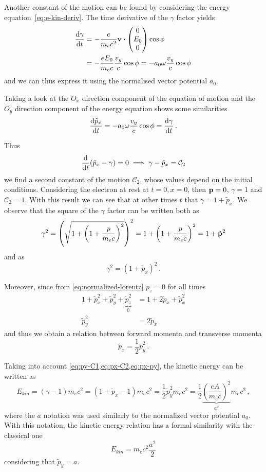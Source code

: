 \documentclass[12pt, class=report, crop=false]{standalone}
\begin{document}
Another constant of the motion can be found by considering the energy
equation~\eqref{eq:e-kin-deriv}. The time derivative of the \(\gamma\) factor
yields
\[
\begin{aligned}
  \dv{\gamma}{t} &= -\frac{e}{m_e c^2} \vb{v} \vdot
  \begin{pmatrix}
    0 \\ E_0 \\ 0
  \end{pmatrix}
  \cos{\phi} \\
  &= -\frac{e E_0}{m_e c}\frac{v_y}{c}\cos{\phi}
  = -a_0\omega \frac{v_y}{c}\cos{\phi}\,
\end{aligned}
\]
and we can thus express it using the normalised vector potential \(a_0\).

Taking a look at the \(O_x\) direction component of the equation of motion and
the \(O_y\) direction component of the energy equation shows some similarities
\[
\dv{\tilde{p}_x}{t} = -a_0\omega \frac{v_y}{c}\cos{\phi} = \dv{\gamma}{t}\,.
\]

Thus
\begin{equation}
  \label{eq:px-C2}
  \dv{t}(\tilde{p}_x - \gamma) = 0 \implies \gamma - \tilde{p}_x = \mathcal{C}_2
\end{equation}
we find a second constant of the motion \(\mathcal{C}_2\), whose values depend on
the initial conditions. Considering the electron at rest at \(t=0,x=0\), then
\(\vb{p}=0\), \(\gamma=1\) and \(\mathcal{C}_2=1\). With this result we can see
that at other times \(t\) that \(\gamma=1+\tilde{p}_x\). We observe that the
square of the \(\gamma\) factor can be written both as
\[
\gamma^2 = {\left(\sqrt{1+{\left(1+\frac{p}{m_e c}\right)}^2}\right)}^2 =
1 + {\left(1+\frac{p}{m_e c}\right)}^2  = 1 + \tilde{\vb{p}}^2
\]
and as
\[
\gamma^2 = {(1+\tilde{p}_x)}^2\,.
\]

Moreover, since from \cref{eq:normalized-lorentz} \(p_z=0\) for all times
\[
\begin{aligned}
  1 + \tilde{p}_x^2 + \tilde{p}_y^2 + \underbrace{\tilde{p}_z^2}_0 &=
  1 + 2\tilde{p}_x + \tilde{p}_x^2 \\
  \tilde{p}_y^2 &= 2\tilde{p}_x
\end{aligned}
\]
and thus we obtain a relation between forward momenta and transverse momenta
\begin{equation}
  \label{eq:px-py}
  \tilde{p}_x = \frac{1}{2} \tilde{p}_y^2\,.
\end{equation}

Taking into account \cref{eq:py-C1,eq:px-C2,eq:px-py}, the kinetic energy can be
written as
\[
E_{kin} = (\gamma-1)m_e c^2 = (1+\tilde{p}_x-1)m_e c^2 =
\frac{1}{2}\tilde{p}_y^2 m_e c^2 =
\frac{1}{2}\underbrace{{\left(\frac{eA}{m_e c}\right)}^2}_{a^2} m_e c^2\,,
\]
where the \(a\) notation was used similarly to the normalized vector potential
\(a_0\). With this notation, the kinetic energy relation has a formal similarity
with the classical one
\[
E_{kin} = m_e c^2 \frac{a^2}{2}
\]
considering that \(\tilde{p}_y=a\).
\end{document}
